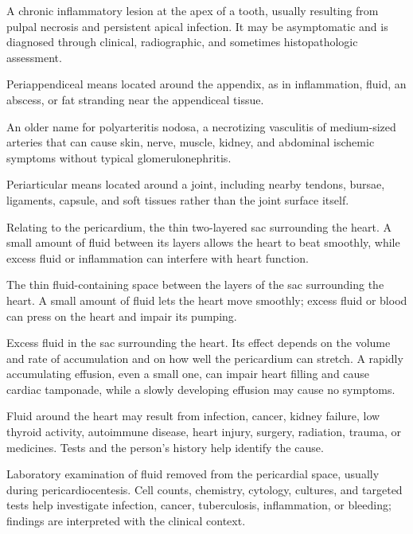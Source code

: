  A chronic inflammatory lesion at the apex of a tooth, usually resulting from pulpal
necrosis and persistent apical infection. It may be asymptomatic and is diagnosed
through clinical, radiographic, and sometimes histopathologic assessment.

 Periappendiceal means located around the appendix, as in inflammation, fluid, an abscess, or fat stranding near the appendiceal tissue.

 An older name for polyarteritis nodosa, a necrotizing vasculitis of medium-sized arteries that can cause skin, nerve, muscle, kidney, and abdominal ischemic symptoms without typical glomerulonephritis.

 Periarticular means located around a joint, including nearby tendons, bursae, ligaments, capsule, and soft tissues rather than the joint surface itself.

 Relating to the pericardium, the thin two-layered sac surrounding the heart. A small amount of fluid between its layers allows the heart to beat smoothly, while excess fluid or inflammation can interfere with heart function.

 The thin fluid-containing space between the layers of the sac surrounding the heart. A small amount of fluid lets the heart move smoothly; excess fluid or blood can press on the heart and impair its pumping.

 Excess fluid in the sac surrounding the heart. Its effect depends on the volume and rate of accumulation and on how well the pericardium can stretch. A rapidly accumulating effusion, even a small one, can impair heart filling and cause cardiac tamponade, while a slowly developing effusion may cause no symptoms.

 Fluid around the heart may result from infection, cancer, kidney failure, low thyroid activity, autoimmune disease, heart injury, surgery, radiation, trauma, or medicines. Tests and the person’s history help identify the cause.

 Laboratory examination of fluid removed from the pericardial space, usually during pericardiocentesis. Cell counts, chemistry, cytology, cultures, and targeted tests help investigate infection, cancer, tuberculosis, inflammation, or bleeding; findings are interpreted with the clinical context.

